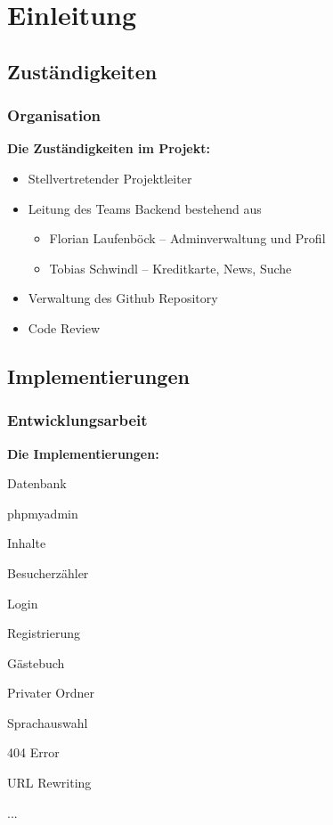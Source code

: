 \section{Einleitung} %
\subsection{Zust\"andigkeiten} %

\begin{frame} %
  \frametitle{Organisation} %

\textbf{Die Zuständigkeiten im Projekt:}
\bigskip
\begin{itemize}
 \item Stellvertretender Projektleiter
 \bigskip
 \item Leitung des Teams Backend bestehend aus
 \begin{itemize}
  \item Florian Laufenböck -- Adminverwaltung und Profil
  \item Tobias Schwindl -- Kreditkarte, News, Suche
 \end{itemize}
 \bigskip
 \item Verwaltung des Github Repository
 \bigskip
 \item Code Review
\end{itemize}


\end{frame}

\subsection{Implementierungen}
\begin{frame} %
  \frametitle{Entwicklungsarbeit} %

\textbf{Die Implementierungen:}
\bigskip

  \begin{itemize}
    \begin{multicols}{2}
      \item Datenbank
      \item phpmyadmin
      \item Inhalte
      \item Besucherzähler
      \item Login
      \item Registrierung
      \item Gästebuch
      \item Privater Ordner
      \item Sprachauswahl
      \item 404 Error
      \item URL Rewriting
      \item ...
    \end{multicols}
  \end{itemize}

\end{frame}
